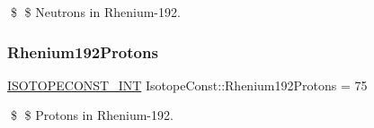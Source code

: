 \$ \$ Neutrons in Rhenium-\/192. \mbox{\label{group___isotope_const-_rhenium-_re192_gae3457f15a83332fc83f89dda289eb021}} 
\subsubsection{\texorpdfstring{Rhenium192\+Protons}{Rhenium192Protons}}
{\footnotesize\ttfamily \mbox{\hyperlink{group___isotope_const-_macros_ga5f18360b3e99483a35c32d789e62621c}{I\+S\+O\+T\+O\+P\+E\+C\+O\+N\+S\+T\+\_\+\+I\+NT}} Isotope\+Const\+::\+Rhenium192\+Protons = 75}

\$ \$ Protons in Rhenium-\/192. 